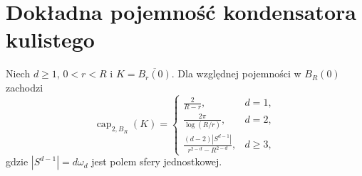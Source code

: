 \section{Dokładna pojemność kondensatora kulistego}
\label{sec:pde19-ball}
\begin{twierdzenie}
\label{thm:pde19-balls}
Niech $d\ge1$, $0<r<R$ i $K=\overline{B_r(0)}$.
Dla względnej pojemności w $B_R(0)$ zachodzi
\begin{equation}\label{eq:pde19-ball-exact}
 \operatorname{cap}_{2,B_R}(K)=
 \begin{cases}
 \displaystyle\frac{2}{R-r},&d=1,\\[5pt]
 \displaystyle\frac{2\pi}{\log(R/r)},&d=2,\\[6pt]
 \displaystyle\frac{(d-2)|S^{d-1}|}{r^{2-d}-R^{2-d}},&d\ge3,
 \end{cases}
\end{equation}
gdzie $|S^{d-1}|=d\omega_d$ jest polem sfery jednostkowej.
\end{twierdzenie}
